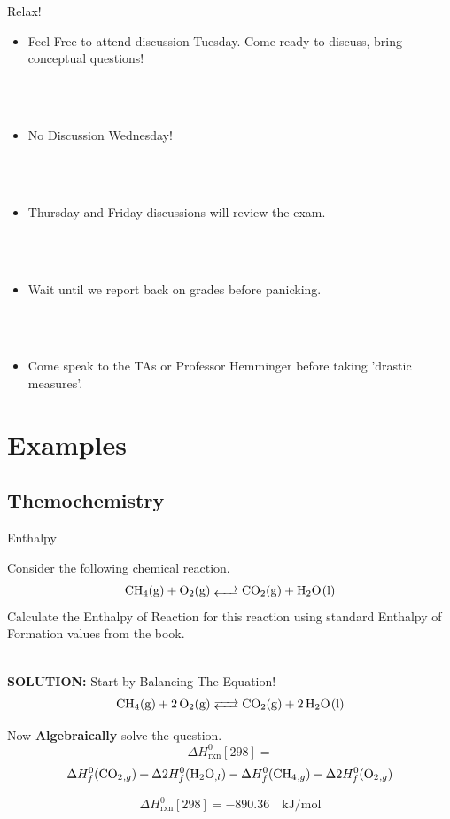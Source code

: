 \documentclass[t,10pt,mathserif,xcolor=pst,pdftex]{beamer}
\newcommand{\be}{\begin{equation}}
\newcommand{\ee}{\end{equation}}
\begin{document}
\begin{frame}{Relax!}

\begin{itemize}
\item Feel Free to attend discussion Tuesday. Come ready to discuss, bring conceptual questions!
\end{itemize}

\\~\

\begin{itemize}
\item No Discussion Wednesday!
\end{itemize}

\\~\

\begin{itemize}
\item Thursday and Friday discussions will review the exam. 
\end{itemize}

\\~\

\begin{itemize}
\item Wait until we report back on grades before panicking. 
\end{itemize}

\\~\

\begin{itemize}
\item Come speak to the TAs or Professor Hemminger before taking 'drastic measures'. 
\end{itemize}

\end{frame}

\section{Examples}

\subsection{Themochemistry}

\begin{frame}{Enthalpy }

Consider the following chemical reaction. 
\be
\ce{CH4(g) + O2(g) <--> CO2(g) + H2O(l)}
\ee
Calculate the Enthalpy of Reaction for this reaction using standard Enthalpy of Formation values from the book. \\~\

\textbf{SOLUTION:}
Start by Balancing The Equation!
\be
\ce{CH4(g) + 2O2(g) <--> CO2(g) + 2H2O(l)}
\ee

Now \textbf{Algebraically} solve the question. 
\be
\Delta H_{\text{rxn}}^0[298] = 
\ee
\be
\Delta H_f^0(\ce{CO2_{,g}}) + \Delta 2H_f^0(\ce{H2O_{,l}}) - \Delta H_f^0(\ce{CH4_{,g}}) - \Delta 2H_f^0(\ce{O2_{,g}}) 
\ee

\be
\Delta H_{\text{rxn}}^0[298] = -890.36 \quad \text{kJ}/\text{mol}
\ee

\end{frame}
\end{document}
